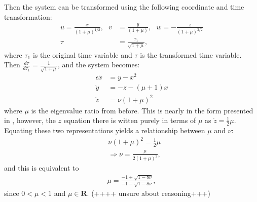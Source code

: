 Then the system can be transformed using the following coordinate and time transformation:
\begin{align}\label{normalform1}
u= \frac{x}{(1+ \mu)^{1/2}}, \ \ \ v &= \frac{y}{(1 + \mu)}, \ \ \  w= -\frac{z}{ (1+\mu)^{3/2}}  \\
\tau &= \frac{\tau_1}{\sqrt{1 + \mu}},
\end{align}
where $\tau_1$ is the original time variable and $\tau$ is the transformed time variable.
Then $\frac{d \tau}{d \tau_1} = \frac{1}{\sqrt{1+ \mu}}$, and the system becomes:
\begin{align}\label{normalform2}
\epsilon \dot{x} &= y - x^2\\
\dot{y} &=- z -(\mu +1)x \\
\dot{z} &= \nu (1 + \mu)^2
\end{align}
where $\mu$ is the eigenvalue ratio from before.
This is nearly in the form presented in \citet{MMO}, however, the $z$ equation there is witten purely in terms of $\mu$ as $\dot{z} = \frac{1}{2} \mu$.
Equating these two representations yields a relationship between $\mu$ and $\nu$:
\begin{align*}
&\nu (1 + \mu)^2 = \frac{1}{2} \mu \\
&\Rightarrow \nu = \frac{\mu}{ 2 (1+ \mu)^2},
\end{align*}
and this is equivalent to 
\begin{align*}
\mu = \frac{ -1 + \sqrt{1 - 8\nu}}{-1 - \sqrt{ 1- 8 \nu}},
\end{align*}
since $0< \mu < 1$ and $\mu \in \mathbf{R}$. (++++ unsure about reasoning+++)

